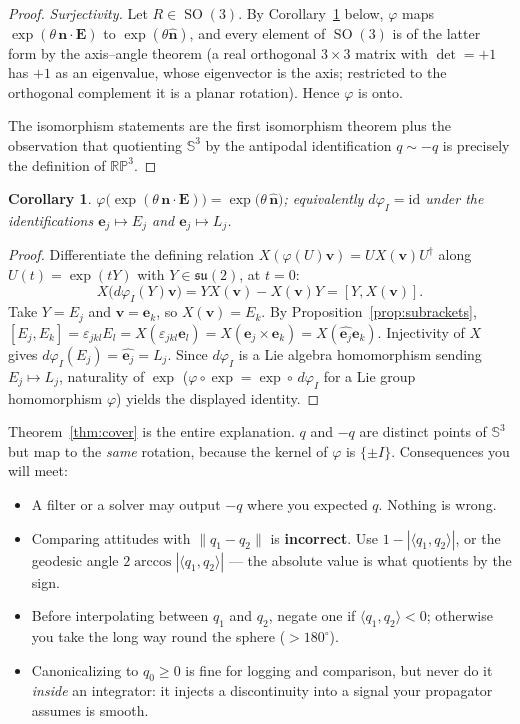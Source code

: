 \documentclass[11pt]{article}
\DeclareMathOperator{\SO}{SO}
\newcommand{\su}{\mathfrak{su}}
\newcommand{\Sph}{\mathbb{S}}
\newcommand{\RP}{\mathbb{RP}}
\newcommand{\vv}[1]{\bm{#1}}
\newcommand{\hatmap}[1]{\widehat{#1}}
\theoremstyle{plain}
\newtheorem{corollary}[theorem]{Corollary}
\theoremstyle{definition}
\begin{document}
\begin{proof}
\emph{Surjectivity.} Let $R\in\SO(3)$. By Corollary~\ref{cor:phiexp} below, $\varphi$ maps
$\exp(\theta\,\vv n\cdot\vv E)$ to $\exp(\theta\hatmap{\vv n})$, and every element of $\SO(3)$ is
of the latter form by the axis--angle theorem (a real orthogonal $3\times3$ matrix with
$\det=+1$ has $+1$ as an eigenvalue, whose eigenvector is the axis; restricted to the orthogonal
complement it is a planar rotation). Hence $\varphi$ is onto.

The isomorphism statements are the first isomorphism theorem plus the observation that quotienting
$\Sph^3$ by the antipodal identification $q\sim-q$ is precisely the definition of $\RP^3$.
\end{proof}

\begin{corollary}\label{cor:phiexp}
$\varphi\big(\exp(\theta\,\vv n\cdot\vv E)\big)=\exp\big(\theta\,\hatmap{\vv n}\big)$; equivalently
$d\varphi_I=\mathrm{id}$ under the identifications $\vv e_j\mapsto E_j$ and $\vv e_j\mapsto L_j$.
\end{corollary}

\begin{proof}
Differentiate the defining relation $X(\varphi(U)\vv v)=UX(\vv v)U^{\dagger}$ along
$U(t)=\exp(tY)$ with $Y\in\su(2)$, at $t=0$:
\[
X\big(d\varphi_I(Y)\vv v\big)=YX(\vv v)-X(\vv v)Y=[Y,X(\vv v)] .
\]
Take $Y=E_j$ and $\vv v=\vv e_k$, so $X(\vv v)=E_k$. By Proposition~\ref{prop:subrackets},
$[E_j,E_k]=\varepsilon_{jkl}E_l=X(\varepsilon_{jkl}\vv e_l)=X(\vv e_j\times\vv e_k)
=X(\hatmap{\vv e_j}\vv e_k)$. Injectivity of $X$ gives $d\varphi_I(E_j)=\hatmap{\vv e_j}=L_j$.
Since $d\varphi_I$ is a Lie algebra homomorphism sending $E_j\mapsto L_j$, naturality of
$\exp$ ($\varphi\circ\exp=\exp\circ\,d\varphi_I$ for a Lie group homomorphism $\varphi$) yields the
displayed identity.
\end{proof}

\begin{practical}
Theorem~\ref{thm:cover} is the entire explanation. $q$ and $-q$ are distinct points of
$\Sph^3$ but map to the \emph{same} rotation, because the kernel of $\varphi$ is $\{\pm I\}$.
Consequences you will meet:
\begin{itemize}[leftmargin=1.2em,topsep=2pt]
\item A filter or a solver may output $-q$ where you expected $q$. Nothing is wrong.
\item Comparing attitudes with $\|q_1-q_2\|$ is \textbf{incorrect}. Use
$1-|\langle q_1,q_2\rangle|$, or the geodesic angle
$2\arccos|\langle q_1,q_2\rangle|$ --- the absolute value is what quotients by the sign.
\item Before interpolating between $q_1$ and $q_2$, negate one if
$\langle q_1,q_2\rangle<0$; otherwise you take the long way round the sphere ($>180^\circ$).
\item Canonicalizing to $q_0\ge0$ is fine for logging and comparison, but never do it \emph{inside}
an integrator: it injects a discontinuity into a signal your propagator assumes is smooth.
\end{itemize}
\end{practical}
\end{document}

